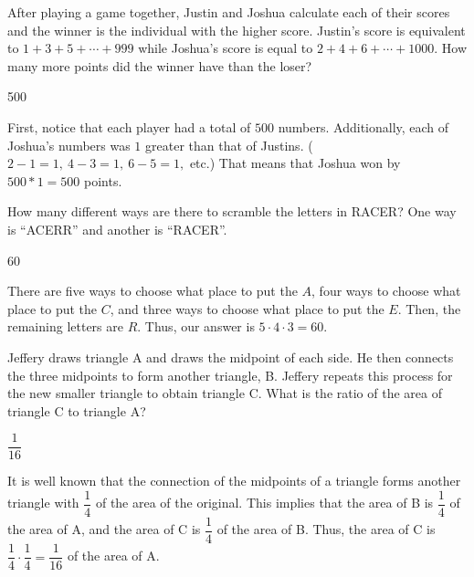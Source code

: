 \documentclass{article}
\begin{document}
\begin{problem}
After playing a game together, Justin and Joshua calculate each of their scores and the winner is the individual with the higher score. Justin's score is equivalent to $1+3+5+\cdots+999$ while Joshua's score is equal to $2+4+6+\cdots+1000$. How many more points did the winner have than the loser? 
\end{problem}
\begin{answer}
500
\end{answer}
\begin{solution}
First, notice that each player had a total of $500$ numbers. Additionally, each of Joshua's numbers was $1$ greater than that of Justins. ($2 - 1 = 1,\ 4 - 3 = 1,\ 6 - 5 = 1, $ etc.) That means that Joshua won by $500*1 = \boxed{500}$ points.
\end{solution}
\begin{problem}
How many different ways are there to scramble the letters in RACER? One way is ``ACERR'' and another is ``RACER''.
\end{problem}
\begin{answer}
60
\end{answer}
\begin{solution}
There are five ways to choose what place to put the $A$, four ways to choose what place to put the $C$, and three ways to choose what place to put the $E$. Then, the remaining letters are $R$. Thus, our answer is $5 \cdot 4 \cdot 3 = \boxed{60}$.
\end{solution}
\begin{problem}
Jeffery draws triangle A and draws the midpoint of each side. He then connects the three midpoints to form another triangle, B. Jeffery repeats this process for the new smaller triangle to obtain triangle C. What is the ratio of the area of triangle C to triangle A? 
\end{problem}
\begin{answer}
$\dfrac{1}{16}$
\end{answer}
\begin{solution}
It is well known that the connection of the midpoints of a triangle forms another triangle with $\dfrac{1}{4}$ of the area of the original. This implies that the area of B is $\dfrac{1}{4}$ of the area of A, and the area of C is $\dfrac{1}{4}$ of the area of B. Thus, the area of C is $\dfrac14 \cdot \dfrac14 = \boxed{\dfrac{1}{16}}$ of the area of A. 
\end{solution}
\end{document}
